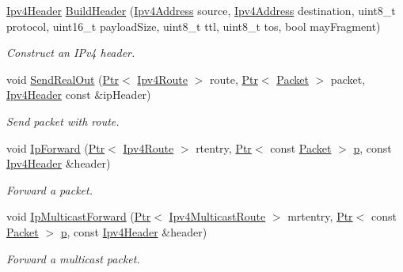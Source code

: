 \begin{DoxyCompactItemize}
\hyperlink{classns3_1_1Ipv4Header}{Ipv4\+Header} \hyperlink{classns3_1_1Ipv4L3Protocol_a3737569960c655fe5441b21a5ef829d3}{Build\+Header} (\hyperlink{classns3_1_1Ipv4Address}{Ipv4\+Address} source, \hyperlink{classns3_1_1Ipv4Address}{Ipv4\+Address} destination, uint8\+\_\+t protocol, uint16\+\_\+t payload\+Size, uint8\+\_\+t ttl, uint8\+\_\+t tos, bool may\+Fragment)
\begin{DoxyCompactList}\small\item\em Construct an I\+Pv4 header. \end{DoxyCompactList}\item 
void \hyperlink{classns3_1_1Ipv4L3Protocol_ac1baf310b12bbc564d0766061ecca323}{Send\+Real\+Out} (\hyperlink{classns3_1_1Ptr}{Ptr}$<$ \hyperlink{classns3_1_1Ipv4Route}{Ipv4\+Route} $>$ route, \hyperlink{classns3_1_1Ptr}{Ptr}$<$ \hyperlink{classns3_1_1Packet}{Packet} $>$ packet, \hyperlink{classns3_1_1Ipv4Header}{Ipv4\+Header} const \&ip\+Header)
\begin{DoxyCompactList}\small\item\em Send packet with route. \end{DoxyCompactList}\item 
void \hyperlink{classns3_1_1Ipv4L3Protocol_ae00b4ef6c6907a602898800ee5dcbc57}{Ip\+Forward} (\hyperlink{classns3_1_1Ptr}{Ptr}$<$ \hyperlink{classns3_1_1Ipv4Route}{Ipv4\+Route} $>$ rtentry, \hyperlink{classns3_1_1Ptr}{Ptr}$<$ const \hyperlink{classns3_1_1Packet}{Packet} $>$ \hyperlink{lte__link__budget__x2__handover__measures_8m_ac9de518908a968428863f829398a4e62}{p}, const \hyperlink{classns3_1_1Ipv4Header}{Ipv4\+Header} \&header)
\begin{DoxyCompactList}\small\item\em Forward a packet. \end{DoxyCompactList}\item 
void \hyperlink{classns3_1_1Ipv4L3Protocol_a85ad438d9b2c50d55d1b674b9fd1e8f7}{Ip\+Multicast\+Forward} (\hyperlink{classns3_1_1Ptr}{Ptr}$<$ \hyperlink{classns3_1_1Ipv4MulticastRoute}{Ipv4\+Multicast\+Route} $>$ mrtentry, \hyperlink{classns3_1_1Ptr}{Ptr}$<$ const \hyperlink{classns3_1_1Packet}{Packet} $>$ \hyperlink{lte__link__budget__x2__handover__measures_8m_ac9de518908a968428863f829398a4e62}{p}, const \hyperlink{classns3_1_1Ipv4Header}{Ipv4\+Header} \&header)
\begin{DoxyCompactList}\small\item\em Forward a multicast packet. \end{DoxyCompactList}\item 

\end{DoxyCompactItemize}
